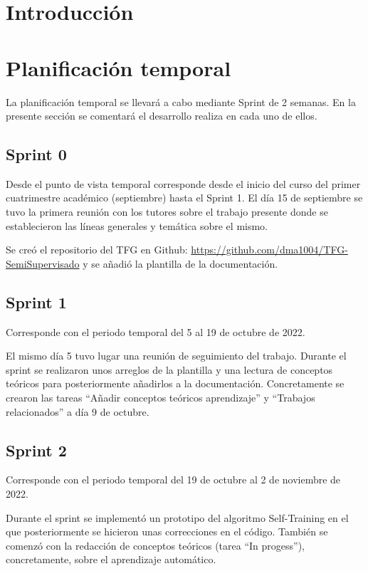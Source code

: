 
\section{Introducción}

\section{Planificación temporal}
La planificación temporal se llevará a cabo mediante Sprint de 2 semanas.
En la presente sección se comentará el desarrollo realiza en cada uno de ellos.

\subsection{Sprint 0}

Desde el punto de vista temporal corresponde desde el inicio del curso del
primer cuatrimestre académico (septiembre) hasta el Sprint 1. El día 15 de
septiembre se tuvo la primera reunión con los tutores sobre el trabajo presente
donde se establecieron las líneas generales y temática sobre el mismo.

Se creó el repositorio del TFG en Github: \url{https://github.com/dma1004/TFG-SemiSupervisado}
y se añadió la plantilla de la documentación.

\subsection{Sprint 1}

Corresponde con el periodo temporal del 5 al 19 de octubre de 2022. 

El mismo día 5 tuvo lugar una reunión de seguimiento del trabajo. Durante el sprint se
realizaron unos arreglos de la plantilla y una lectura de conceptos teóricos
para posteriormente añadirlos a la documentación. Concretamente se crearon las
tareas ``Añadir conceptos teóricos aprendizaje'' y ``Trabajos relacionados'' a
día 9 de octubre.

\subsection{Sprint 2}

Corresponde con el periodo temporal del 19 de octubre al 2 de noviembre de 2022. 

Durante el sprint se implementó un prototipo del algoritmo Self-Training en el
que posteriormente se hicieron unas correcciones en el código. También se
comenzó con la redacción de conceptos teóricos (tarea ``In progess''), concretamente, sobre el
aprendizaje automático.

